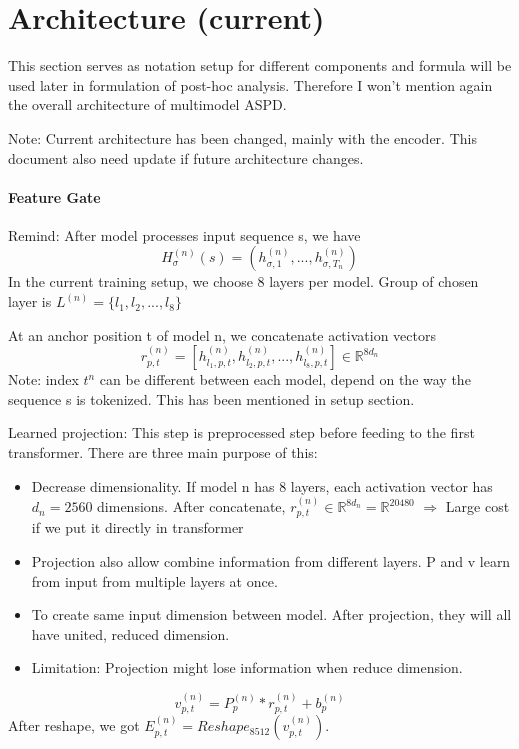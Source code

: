 \documentclass[11pt,a4paper]{article}
\newcommand{\RR}{\mathbb{R}}
\begin{document}
\section{Architecture (current)}
This section serves as notation setup for different components and formula will be used later in formulation of post-hoc analysis. Therefore I won't mention again the overall architecture of multimodel ASPD.

Note: Current architecture has been changed, mainly with the encoder. This document also need update if future architecture changes.
\paragraph{Feature Gate}
Remind: After model processes input sequence s, we have
$$
H_{\sigma}^{(n)}(s) = (h_{\sigma, 1}^{(n)}, ..., h_{\sigma, T_n}^{(n)})
$$
In the current training setup, we choose 8 layers per model. Group of chosen layer is $L^{(n)} = \{l_1, l_2, ..., l_8\}$

At an anchor position t of model n, we concatenate activation vectors
$$
r_{p,t}^{(n)} = [h_{l_1, p, t}^{(n)}, h_{l_2, p, t}^{(n)}, ..., h_{l_8, p, t}^{(n)}] \in \RR^{8d_n}
$$
Note: index $t^{n}$ can be different between each model, depend on the way the sequence s is tokenized. This has been mentioned in setup section.

Learned projection: This step is preprocessed step before feeding to the first transformer. There are three main purpose of this:
\begin{itemize}
\item Decrease dimensionality. If model n has 8 layers, each activation vector has $d_n = 2560$ dimensions. After concatenate, $r_{p,t}^{(n)} \in \RR^{8d_n} = \RR^{20480}$ $\Rightarrow$
Large cost if we put it directly in transformer
\item Projection also allow combine information from different layers. P and v learn from input from multiple layers at once.
\item To create same input dimension between model. After projection, they will all have united, reduced dimension.
\item Limitation: Projection might lose information when reduce dimension.
\end{itemize}
$$
v_{p, t}^{(n)} = P^{(n)}_p*r^{(n)}_{p,t} + b^{(n)}_p
$$
After reshape, we got $E^{(n)}_{p,t}  =Reshape_{8512}(v_{p,t}^{(n)})$.
\end{document}
